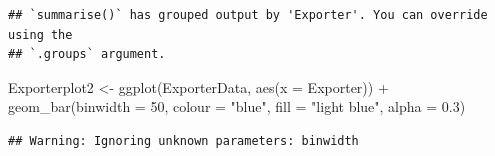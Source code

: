 \documentclass[
  12pt,
]{article}
\newenvironment{Shaded}{\begin{snugshade}}{\end{snugshade}}
\newcommand{\AttributeTok}[1]{\textcolor[rgb]{0.77,0.63,0.00}{#1}}
\newcommand{\DecValTok}[1]{\textcolor[rgb]{0.00,0.00,0.81}{#1}}
\newcommand{\FloatTok}[1]{\textcolor[rgb]{0.00,0.00,0.81}{#1}}
\newcommand{\FunctionTok}[1]{\textcolor[rgb]{0.00,0.00,0.00}{#1}}
\newcommand{\NormalTok}[1]{#1}
\newcommand{\OtherTok}[1]{\textcolor[rgb]{0.56,0.35,0.01}{#1}}
\newcommand{\SpecialCharTok}[1]{\textcolor[rgb]{0.00,0.00,0.00}{#1}}
\newcommand{\StringTok}[1]{\textcolor[rgb]{0.31,0.60,0.02}{#1}}
\begin{document}
\begin{verbatim}
## `summarise()` has grouped output by 'Exporter'. You can override using the
## `.groups` argument.
\end{verbatim}

\begin{Shaded}
\begin{Highlighting}[]
\NormalTok{Exporterplot2 }\OtherTok{\textless{}{-}} \FunctionTok{ggplot}\NormalTok{(ExporterData, }\FunctionTok{aes}\NormalTok{(}\AttributeTok{x =}\NormalTok{ Exporter)) }\SpecialCharTok{+} \FunctionTok{geom\_bar}\NormalTok{(}\AttributeTok{binwidth =} \DecValTok{50}\NormalTok{,}
    \AttributeTok{colour =} \StringTok{"blue"}\NormalTok{, }\AttributeTok{fill =} \StringTok{"light blue"}\NormalTok{, }\AttributeTok{alpha =} \FloatTok{0.3}\NormalTok{)}
\end{Highlighting}
\end{Shaded}

\begin{verbatim}
## Warning: Ignoring unknown parameters: binwidth
\end{verbatim}
\end{document}

